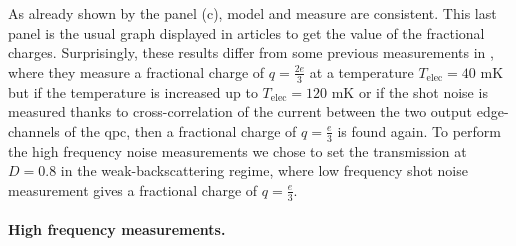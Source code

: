 As already shown by the panel (c), model and measure are consistent.
This last panel is the usual graph displayed in articles \cite{saminadayar1997observation,de1998direct,reznikov1999observation} to get the value of the fractional charges.
Surprisingly, these results differ from some previous measurements in \cite{bid2009shot,kapfer2018dynamic}, where they measure a fractional charge of $q=\frac{2e}{3}$ at a temperature $T_{\mathrm{elec}} = 40$ mK but if the temperature is increased up to $T_{\mathrm{elec}} = 120$ mK or if the shot noise is measured thanks to cross-correlation of the current between the two output edge-channels of the qpc, then a fractional charge of $q=\frac{e}{3}$ is found again.
To perform the high frequency noise measurements we chose to set the transmission at $D = 0.8$ in the weak-backscattering regime, where low frequency shot noise measurement gives a fractional charge of $q=\frac{e}{3}$.

\paragraph*{High frequency measurements.}

